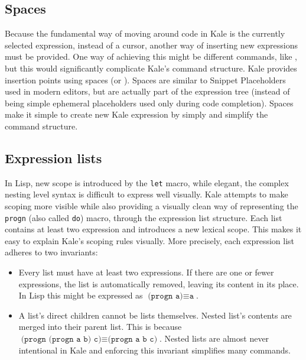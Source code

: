 \subsection{Spaces}
\label{expr:blank}
Because the fundamental way of moving around code in Kale is the currently
selected expression, instead of a cursor, another way of inserting new
expressions must be provided. One way of achieving this might be different
commands, like , but this would
significantly complicate Kale's command structure. Kale
provides insertion points using spaces (or ).
Spaces are similar to Snippet Placeholders used in modern editors,
but are actually part of the expression tree (instead of being simple ephemeral
placeholders used only during code completion). Spaces make it simple to create
new Kale expression by simply  and simplify the
command structure.

\subsection{Expression lists}
\label{expr:list}
In Lisp, new scope is introduced by the \texttt{let} macro, while elegant, the
complex nesting level syntax is difficult to express well visually. Kale
attempts to make scoping more visible while also providing a visually clean
way of representing the \texttt{progn} (also called \texttt{do}) macro,
through the expression list structure. Each list contains at least two
expression and introduces a new lexical scope. This makes it easy to explain
Kale's scoping rules visually. More precisely, each expression list
adheres to two invariants:
\begin{itemize}
	\item Every list must have at least two expressions. If there are one or
	fewer expressions, the list is automatically removed, leaving its content
	in its place. In Lisp this might be expressed as
	$\texttt{(progn a)} \equiv \texttt{a}$.
	\item A list's direct children cannot be lists themselves. Nested list's
	contents are merged into their parent list. This is because
	$\texttt{(progn (progn a b) c)} \equiv \texttt{(progn a b c)}$.
	Nested lists are almost never intentional in Kale and enforcing this
	invariant simplifies many commands.
\end{itemize}

\needspace{7cm}
